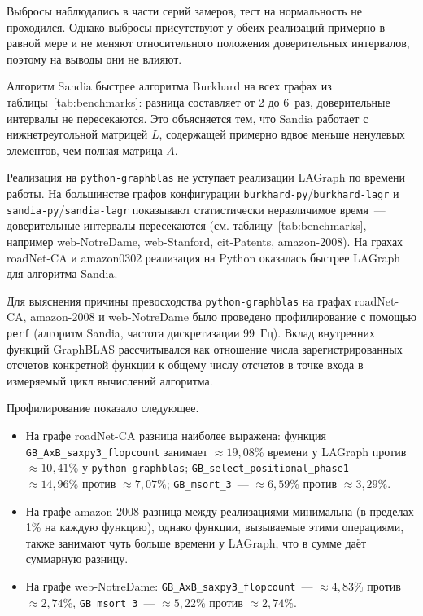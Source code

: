\documentclass[a4paper]{article}
\begin{document}
Выбросы наблюдались в части серий замеров, тест на нормальность не проходился.
Однако выбросы присутствуют у обеих реализаций примерно в равной мере и не меняют относительного положения доверительных интервалов, поэтому на выводы они не влияют.

Алгоритм Sandia быстрее алгоритма Burkhard на всех графах из таблицы~\ref{tab:benchmarks}: разница составляет от 2 до 6~раз, доверительные интервалы не пересекаются.
Это объясняется тем, что Sandia работает с нижнетреугольной матрицей $L$, содержащей примерно вдвое меньше ненулевых элементов, чем полная матрица $A$.

Реализация на \texttt{python-graphblas} не уступает реализации LAGraph по времени работы.
На большинстве графов конфигурации \texttt{burkhard-py}/\allowbreak\texttt{burkhard-lagr} и \texttt{sandia-py}/\allowbreak\texttt{sandia-lagr} показывают статистически неразличимое время~--- доверительные интервалы пе\-ре\-се\-ка\-ют\-ся (см. таблицу~\ref{tab:benchmarks}, например web-NotreDame, web-Stanford, cit-Patents, amazon-2008).
На грахах roadNet-CA и amazon0302 реализация на Python оказалась быстрее LAGraph для алгоритма Sandia.

Для выяснения причины превосходства \texttt{python-graphblas} на графах roadNet-CA, amazon-2008 и web-NotreDame было проведено профилирование с помощью \texttt{perf} (алгоритм Sandia, частота дискретизации 99~Гц). Вклад внутренних функций GraphBLAS рас\-счи\-ты\-вал\-ся как отношение числа зарегистрированных отсчетов конкретной функции к общему числу отсчетов в точке входа в измеряемый цикл вычислений алгоритма.

Профилирование показало следующее.
\begin{itemize}
    \item На графе roadNet-CA разница наиболее выражена: функция \texttt{GB\_AxB\_saxpy3\_flopcount} занимает $\approx 19{,}08\%$ времени у LAGraph против $\approx 10{,}41\%$ у \texttt{python-graphblas}; \texttt{GB\_select\_positional\_phase1}~--- $\approx 14{,}96\%$ против $\approx 7{,}07\%$; \texttt{GB\_msort\_3}~--- $\approx 6{,}59\%$ против $\approx 3{,}29\%$.
    \item На графе amazon-2008 разница между реализациями минимальна (в пределах 1\% на каждую функцию), однако функции, вызываемые этими операциями, также занимают чуть больше времени у LAGraph, что в сумме даёт суммарную разницу.
    \item На графе web-NotreDame: \texttt{GB\_AxB\_saxpy3\_flopcount}~--- $\approx 4{,}83\%$ против $\approx 2{,}74\%$, \texttt{GB\_msort\_3}~--- $\approx 5{,}22\%$ против $\approx 2{,}74\%$.
\end{itemize}
\end{document}
